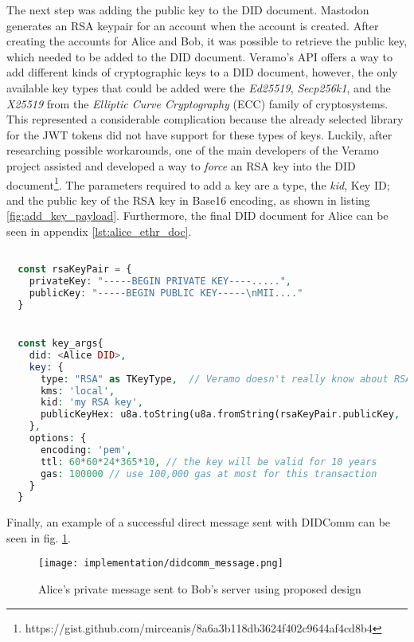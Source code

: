 The next step was adding the public key to the DID document. Mastodon generates an RSA keypair for an account when the account is created. After creating the accounts for Alice and Bob, it was possible to retrieve the public key, which needed to be added to the DID document. Veramo's API offers a way to add different kinds of cryptographic keys to a DID document, however, the only available key types that could be added were the \emph{Ed25519}, \emph{Secp256k1}, and the  \emph{X25519} from the \emph{Elliptic Curve Cryptography} (ECC) family of cryptosystems. This represented a considerable complication because the already selected library for the JWT tokens did not have support for these types of keys. Luckily, after researching possible workarounds, one of the main developers of the Veramo project assisted and developed a way to \emph{force} an RSA key into the DID document\footnote{https://gist.github.com/mirceanis/8a6a3b118db3624f402c9644af4cd8b4}. The parameters required to add a key are a type, the \emph{kid}, Key ID; and the public key of the RSA key in Base16 encoding, as shown in listing \ref{fig:add_key_payload}. Furthermore, the final DID document for Alice can be seen in appendix \ref{lst:alice_ethr_doc}. 

\lstset{style=JSONStyle}
\begin{lstlisting}[language=PHP, caption=Adding an RSA key using Veramo, label=fig:add_key_payload, float=h]

  const rsaKeyPair = {
    privateKey: "-----BEGIN PRIVATE KEY----.....",
    publicKey: "-----BEGIN PUBLIC KEY-----\nMII...."
  }


  const key_args{
    did: <Alice DID>,
    key: {
      type: "RSA" as TKeyType,  // Veramo doesn't really know about RSA keys, but it doesn't matter in this case if we coerce it.
      kms: 'local',
      kid: 'my RSA key',
      publicKeyHex: u8a.toString(u8a.fromString(rsaKeyPair.publicKey, 'utf-8'), 'base16')
    },
    options: {
      encoding: 'pem',
      ttl: 60*60*24*365*10, // the key will be valid for 10 years
      gas: 100000 // use 100,000 gas at most for this transaction
    }
  }

\end{lstlisting}


Finally, an example of a successful direct message sent with DIDComm can be seen in fig. \ref{fig:didcomm_message}.

\begin{figure}[H]
  \centering
  \texttt{[image: implementation/didcomm\_message.png]}
  \caption{Alice's private message sent to Bob's server using proposed design}
  \label{fig:didcomm_message}
\end{figure}


